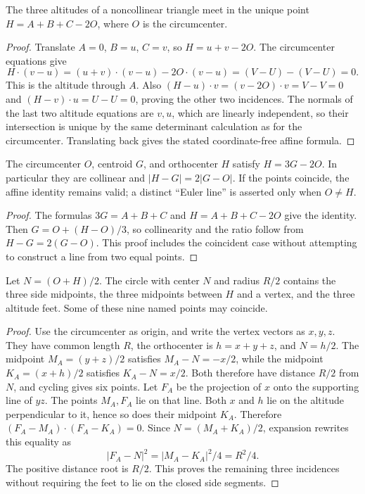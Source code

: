 \begin{theorem}
\label{tri:orthocenter}
The three altitudes of a noncollinear triangle meet in the unique point
$H=A+B+C-2O$, where $O$ is the circumcenter.
\end{theorem}
\begin{proof}
Translate $A=0$, $B=u$, $C=v$, so $H=u+v-2O$.
The circumcenter equations give
\[
 H\mathbin{\cdot}(v-u)
 =(u+v)\mathbin{\cdot}(v-u)-2O\mathbin{\cdot}(v-u)
 =(V-U)-(V-U)=0.
\]
This is the altitude through $A$.  Also
$(H-u)\mathbin{\cdot}v=(v-2O)\mathbin{\cdot}v=V-V=0$ and
$(H-v)\mathbin{\cdot}u=U-U=0$, proving the other two incidences.
The normals of the last two altitude equations are $v,u$, which are
linearly independent, so their intersection is unique by the same
determinant calculation as for the circumcenter.  Translating back gives
the stated coordinate-free affine formula.
\end{proof}

\begin{theorem}
\label{tri:euler-line}
The circumcenter $O$, centroid $G$, and orthocenter $H$ satisfy
$H=3G-2O$.  In particular they are collinear and $|H-G|=2|G-O|$.
If the points coincide, the affine identity remains valid; a distinct
``Euler line'' is asserted only when $O\ne H$.
\end{theorem}
\begin{proof}
The formulas $3G=A+B+C$ and $H=A+B+C-2O$ give the identity.
Then $G=O+(H-O)/3$, so collinearity and the ratio follow from
$H-G=2(G-O)$.  This proof includes the coincident case without attempting
to construct a line from two equal points.
\end{proof}

\begin{theorem}
\label{tri:nine-point}
Let $N=(O+H)/2$.  The circle with center $N$ and radius $R/2$ contains
the three side midpoints, the three midpoints between $H$ and a vertex,
and the three altitude feet.  Some of these nine named points may
coincide.
\end{theorem}
\begin{proof}
Use the circumcenter as origin, and write the vertex vectors as $x,y,z$.
They have common length $R$, the orthocenter is $h=x+y+z$, and $N=h/2$.
The midpoint $M_A=(y+z)/2$ satisfies $M_A-N=-x/2$, while the midpoint
$K_A=(x+h)/2$ satisfies $K_A-N=x/2$.  Both therefore have distance
$R/2$ from $N$, and cycling gives six points.
Let $F_A$ be the projection of $x$ onto the supporting line of $yz$.
The points $M_A,F_A$ lie on that line.  Both $x$ and $h$ lie on the
altitude perpendicular to it, hence so does their midpoint $K_A$.
Therefore
$(F_A-M_A)\mathbin{\cdot}(F_A-K_A)=0$.
Since $N=(M_A+K_A)/2$, expansion rewrites this equality as
\[
 |F_A-N|^2=|M_A-K_A|^2/4=R^2/4.
\]
The positive distance root is $R/2$.  This proves the remaining three
incidences without requiring the feet to lie on the closed side segments.
\end{proof}

